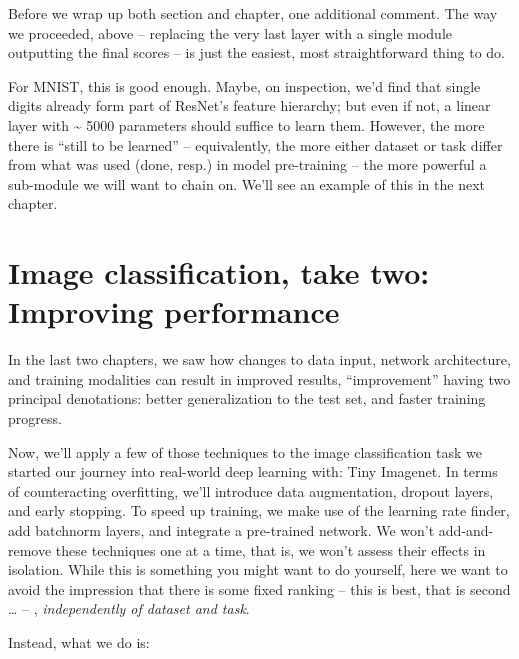 \documentclass[
  letterpaper,
]{krantz}
\begin{document}
Before we wrap up both section and chapter, one additional comment. The
way we proceeded, above -- replacing the very last layer with a single
module outputting the final scores -- is just the easiest, most
straightforward thing to do.

For MNIST, this is good enough. Maybe, on inspection, we'd find that
single digits already form part of ResNet's feature hierarchy; but even
if not, a linear layer with \textasciitilde{} 5000 parameters should
suffice to learn them. However, the more there is ``still to be
learned'' -- equivalently, the more either dataset or task differ from
what was used (done, resp.) in model pre-training -- the more powerful a
sub-module we will want to chain on. We'll see an example of this in the
next chapter.

\hypertarget{sec:image-classification-2}{%
\chapter{Image classification, take two: Improving
performance}\label{sec:image-classification-2}}

In the last two chapters, we saw how changes to data input, network
architecture, and training modalities can result in improved results,
``improvement'' having two principal denotations: better generalization
to the test set, and faster training progress.

Now, we'll apply a few of those techniques to the image classification
task we started our journey into real-world deep learning with: Tiny
Imagenet. In terms of counteracting overfitting, we'll introduce data
augmentation, dropout layers, and early stopping. To speed up training,
we make use of the learning rate finder, add batchnorm layers, and
integrate a pre-trained network. We won't add-and-remove these
techniques one at a time, that is, we won't assess their effects in
isolation. While this is something you might want to do yourself, here
we want to avoid the impression that there is some fixed ranking -- this
is best, that is second \ldots{} -- , \emph{independently of dataset and
task}.

Instead, what we do is:
\end{document}
